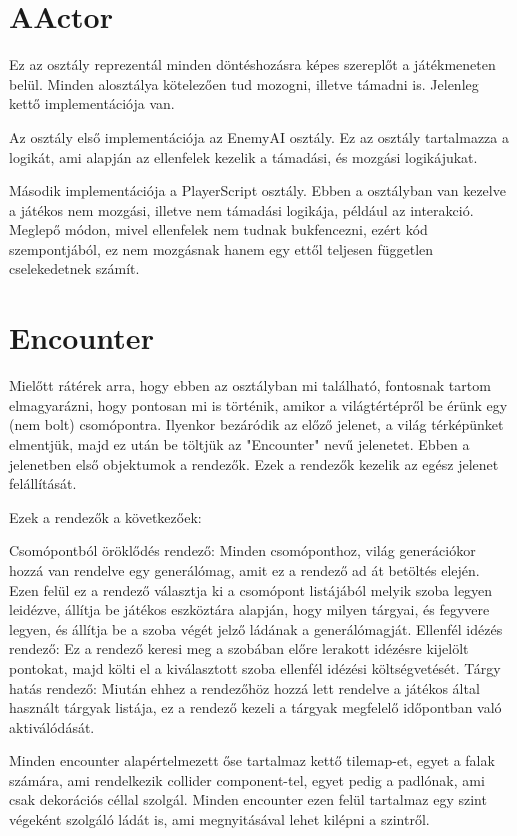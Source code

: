 \documentclass[
]{thesis-ekf}
\theoremstyle{definition}
\theoremstyle{remark}
\begin{document}
	\section{AActor}
	Ez az osztály reprezentál minden döntéshozásra képes szereplőt a játékmeneten belül. Minden alosztálya kötelezően tud mozogni, illetve támadni is. Jelenleg kettő implementációja van.
	
	Az osztály első implementációja az EnemyAI osztály. Ez az osztály tartalmazza a logikát, ami alapján az ellenfelek kezelik a támadási, és mozgási logikájukat.
	
	Második implementációja a PlayerScript osztály. Ebben a osztályban van kezelve a játékos nem mozgási, illetve nem támadási logikája, például az interakció. Meglepő módon, mivel ellenfelek nem tudnak bukfencezni, ezért kód szempontjából, ez nem mozgásnak hanem egy ettől teljesen független cselekedetnek számít.
	\section{Encounter}
	Mielőtt rátérek arra, hogy ebben az osztályban mi található, fontosnak tartom elmagyarázni, hogy pontosan mi is történik, amikor a világtértépről be érünk egy (nem bolt) csomópontra. Ilyenkor bezáródik az előző jelenet, a világ térképünket elmentjük, majd ez után be töltjük az "Encounter" nevű jelenetet. Ebben a jelenetben első objektumok a rendezők. Ezek a rendezők kezelik az egész jelenet felállítását.
	
	Ezek a rendezők a következőek:
	
	Csomópontból öröklődés rendező: Minden csomóponthoz, világ generációkor hozzá van rendelve egy generálómag, amit ez a rendező ad át betöltés elején. Ezen felül ez a rendező választja ki a csomópont listájából melyik szoba legyen leidézve, állítja be játékos eszköztára alapján, hogy milyen tárgyai, és fegyvere legyen, és állítja be a szoba végét jelző ládának a generálómagját.
	Ellenfél idézés rendező: Ez a rendező keresi meg a szobában előre lerakott idézésre kijelölt pontokat, majd költi el a kiválasztott szoba ellenfél idézési költségvetését.
	Tárgy hatás rendező: Miután ehhez a rendezőhöz hozzá lett rendelve a játékos által használt tárgyak listája, ez a rendező kezeli a tárgyak megfelelő időpontban való aktiválódását.
	
	Minden encounter alapértelmezett őse tartalmaz kettő tilemap-et, egyet a falak számára, ami rendelkezik collider component-tel, egyet pedig a padlónak, ami csak dekorációs céllal szolgál. Minden encounter ezen felül tartalmaz egy szint végeként szolgáló ládát is, ami megnyitásával lehet kilépni a szintről.
\end{document}
